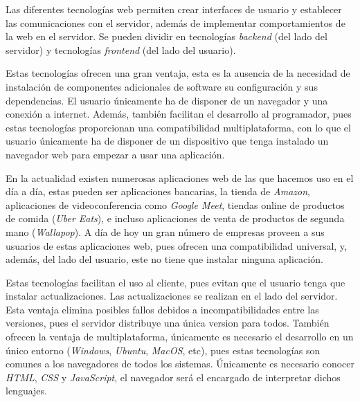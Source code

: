 \documentclass[a4paper, 12pt]{book}
\begin{document}
Las diferentes tecnologías web permiten crear interfaces de usuario y establecer las comunicaciones con el servidor, además de implementar comportamientos de la web en el servidor. Se pueden dividir en tecnologías \emph{backend} (del lado del servidor) y tecnologías \emph{frontend} (del lado del usuario).


Estas tecnologías ofrecen una gran ventaja, esta es la ausencia de la necesidad de instalación de componentes adicionales de software su configuración y sus dependencias. El usuario únicamente ha de disponer de un navegador y una conexión a internet. Además, también facilitan el desarrollo al programador, pues estas tecnologías proporcionan una compatibilidad multiplataforma, con lo que el usuario únicamente ha de disponer de un dispositivo que tenga instalado un navegador web para empezar a usar una aplicación.

En la actualidad existen numerosas aplicaciones web de las que hacemos uso en el día a día, estas pueden ser aplicaciones bancarias, la tienda de \emph{Amazon}, aplicaciones de videoconferencia como \emph{Google Meet}, tiendas online de productos de comida (\emph{Uber Eats}), e incluso aplicaciones de venta de productos de segunda mano (\emph{Wallapop}). A día de hoy un gran número de empresas proveen a sus usuarios de estas aplicaciones web, pues ofrecen una compatibilidad universal, y, además, del lado del usuario, este no tiene que instalar ninguna aplicación. 

Estas tecnologías facilitan el uso al cliente, pues evitan que el usuario tenga que instalar actualizaciones. Las actualizaciones se realizan en el lado del servidor. Esta ventaja elimina posibles fallos debidos a incompatibilidades entre las versiones, pues el servidor distribuye una única version para todos. También ofrecen la ventaja de multiplataforma, únicamente es necesario el desarrollo en un único entorno (\emph{Windows}, \emph{Ubuntu}, \emph{MacOS}, etc), pues estas tecnologías son comunes a los navegadores de todos los sistemas. Únicamente es necesario conocer \emph{HTML}, \emph{CSS} y \emph{JavaScript}, el navegador será el encargado de interpretar dichos lenguajes.
\end{document}
